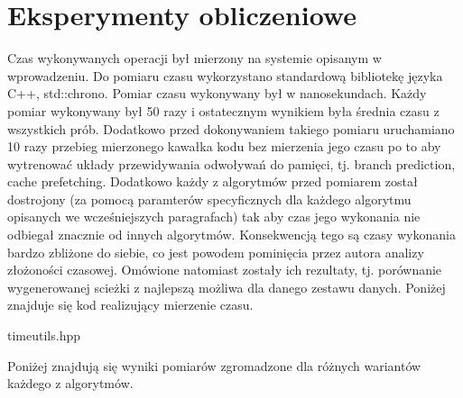 \documentclass[polish,polish,a4paper]{article}
\begin{document}
\section{Eksperymenty obliczeniowe}
Czas wykonywanych operacji był mierzony na systemie opisanym w wprowadzeniu.
Do pomiaru czasu wykorzystano standardową bibliotekę języka C++, std::chrono.
Pomiar czasu wykonywany był w nanosekundach. Każdy pomiar wykonywany był 50 razy i ostatecznym wynikiem była średnia czasu z wszystkich prób.
Dodatkowo przed dokonywaniem takiego pomiaru uruchamiano 10 razy przebieg mierzonego kawałka kodu bez mierzenia jego czasu po to aby wytrenować układy przewidywania odwoływań do pamięci,
tj. branch prediction, cache prefetching.
Dodatkowo każdy z algorytmów przed pomiarem został dostrojony (za pomocą paramterów specyficznych dla każdego algorytmu opisanych we wcześniejszych
paragrafach) tak aby czas jego wykonania nie odbiegał znacznie od innych algorytmów. Konsekwencją tego są czasy wykonania bardzo zbliżone do siebie,
co jest powodem pominięcia przez autora analizy złożoności czasowej. Omówione natomiast zostały ich rezultaty, tj. porównanie wygenerowanej
scieżki z najlepszą możliwa dla danego zestawu danych.
Poniżej znajduje się kod realizujący mierzenie czasu.


{timeutils.hpp}

\par
Poniżej znajdują się wyniki pomiarów zgromadzone dla różnych wariantów każdego z algorytmów.
\end{document}
